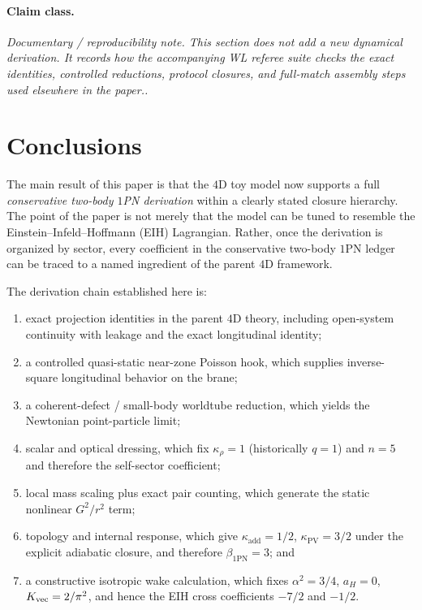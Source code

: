 \documentclass[11pt]{article}
\newcommand{\kadd}{\kappa_{\mathrm{add}}}
\newcommand{\kPV}{\kappa_{\mathrm{PV}}}
\newcommand{\krho}{\kappa_{\rho}}
\newcommand{\betaPN}{\beta_{\mathrm{1PN}}}
\newcommand{\claimclass}[1]{\paragraph{Claim class.}\emph{#1.}}
\begin{document}
\claimclass{Documentary / reproducibility note. This section does not add a new dynamical
derivation. It records how the accompanying WL referee suite checks the exact identities,
controlled reductions, protocol closures, and full-match assembly steps used elsewhere in
the paper.}

\section{Conclusions}
\label{sec:conclusions}

The main result of this paper is that the \(4\)D toy model now supports a full
\emph{conservative two-body \(1\)PN derivation} within a clearly stated closure hierarchy.
The point of the paper is not merely that the model can be tuned to resemble the
Einstein--Infeld--Hoffmann (EIH) Lagrangian. Rather, once the derivation is organized by
sector, every coefficient in the conservative two-body \(1\)PN ledger can be traced to a
named ingredient of the parent \(4\)D framework.

The derivation chain established here is:
\begin{enumerate}[leftmargin=1.5em]
  \item exact projection identities in the parent \(4\)D theory, including open-system
  continuity with leakage and the exact longitudinal identity;
  \item a controlled quasi-static near-zone Poisson hook, which supplies inverse-square
  longitudinal behavior on the brane;
  \item a coherent-defect / small-body worldtube reduction, which yields the Newtonian
  point-particle limit;
  \item scalar and optical dressing, which fix \(\krho=1\) (historically \(q=1\)) and
  \(n=5\) and therefore the self-sector coefficient;
  \item local mass scaling plus exact pair counting, which generate the static nonlinear
  \(G^2/r^2\) term;
  \item topology and internal response, which give \(\kadd=1/2\),
  \(\kPV=3/2\) under the explicit adiabatic closure, and therefore
  \(\betaPN=3\); and
  \item a constructive isotropic wake calculation, which fixes
  \(\alpha^2=3/4\), \(a_H=0\), \(K_{\rm vec}=2/\pi^2\), and hence the EIH cross
  coefficients \(-7/2\) and \(-1/2\).
\end{enumerate}
\end{document}
